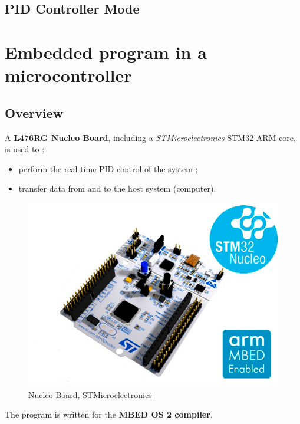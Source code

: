 \documentclass[14pt,fleqn]{book} %
\begin{document}
\section{PID Controller Mode}

%

\chapter{Embedded program in a microcontroller}

\section{Overview}

A \textbf{L476RG Nucleo Board}, including a \textit{STMicroelectronics} STM32 ARM core, is used to :
\begin{itemize}
	\item perform the real-time PID control of the system ;
	\item transfer data from and to the host system (computer).
\end{itemize}

\begin{figure}[!h]
	\centering
	\includegraphics[width=12cm]{images/nucleo.jpg}
	\caption{Nucleo Board, STMicroelectronics}
	\label{fig:nucleoBoard}
\end{figure}

The program is written for the \textbf{MBED OS 2 compiler}.
\end{document}
